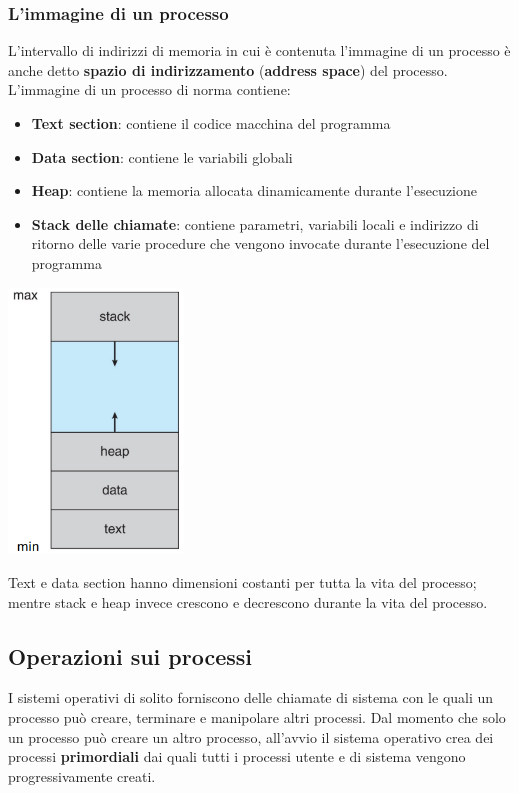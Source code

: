 \documentclass[12pt]{article}
\begin{document}
\subsubsection{L'immagine di un processo}
L'intervallo di indirizzi di memoria in cui è contenuta l'immagine di un processo è anche detto \textbf{spazio di indirizzamento} (\textbf{address space}) del processo.
L'immagine di un processo di norma contiene:
\begin{itemize}
    \item \textbf{Text section}: contiene il codice macchina del programma
    \item \textbf{Data section}: contiene le variabili globali
    \item \textbf{Heap}: contiene la memoria allocata dinamicamente durante l'esecuzione
    \item \textbf{Stack delle chiamate}: contiene parametri, variabili locali e indirizzo di ritorno delle varie procedure che vengono invocate durante l'esecuzione del programma
\end{itemize}
\begin{center}
    \includegraphics[width = 0.35\textwidth]{Images/10.PNG}
\end{center}
Text e data section hanno dimensioni costanti per tutta la vita del processo; mentre stack e heap invece crescono e decrescono durante la vita del processo.
\subsection{Operazioni sui processi}
I sistemi operativi di solito forniscono delle chiamate di sistema con le quali un processo può creare, terminare e manipolare altri processi.
Dal momento che solo un processo può creare un altro processo, all'avvio il sistema operativo crea dei processi \textbf{primordiali} dai quali tutti i processi utente e di sistema vengono progressivamente creati.
\end{document}
